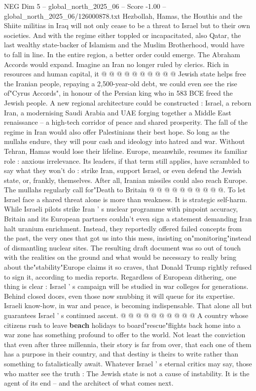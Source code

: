 \begin{textsample}{NEG Dim 5 – global\_north\_2025\_06 – Score -1.00 – global\_north\_2025\_06/126000878.txt}
Hezbollah, Hamas, the Houthis and the Shiite militias in Iraq will not only cease to be a threat to Israel but to their own societies.
And with the regime either toppled or incapacitated, also Qatar, the last wealthy state-backer of Islamism and the Muslim Brotherhood, would have to fall in line.
In the entire region, a better order could emerge.
The Abraham Accords would expand.
Imagine an Iran no longer ruled by clerics.
Rich in resources and human capital, it @ @ @ @ @ @ @ @ @ @ Jewish state helps free the Iranian people, repaying a 2,500-year-old debt, we could even see the rise of"Cyrus Accords", in honour of the Persian king who in 583 BCE freed the Jewish people.
A new regional architecture could be constructed : Israel, a reborn Iran, a modernising Saudi Arabia and UAE forging together a Middle East renaissance -- a high-tech corridor of peace and shared prosperity.
The fall of the regime in Iran would also offer Palestinians their best hope.
So long as the mullahs endure, they will pour cash and ideology into hatred and war.
Without Tehran, Hamas would lose their lifeline.
Europe, meanwhile, resumes its familiar role : anxious irrelevance.
Its leaders, if that term still applies, have scrambled to say what they won't do : strike Iran, support Israel, or even defend the Jewish state, or, frankly, themselves.
After all, Iranian missiles could also reach Europe.
The mullahs regularly call for"Death to Britain @ @ @ @ @ @ @ @ @ @.
To let Israel face a shared threat alone is more than weakness.
It is strategic self-harm.
While Israeli pilots strike Iran ' s nuclear programme with pinpoint accuracy, Britain and its European partners couldn't even sign a statement demanding Iran halt uranium enrichment.
Instead, they reportedly offered failed concepts from the past, the very ones that got us into this mess, insisting on"monitoring"instead of dismantling nuclear sites.
The resulting draft document was so out of touch with the realities on the ground and what would be necessary to really bring about the"stability"Europe claims it so craves, that Donald Trump rightly refused to sign it, according to media reports.
Regardless of European dithering, one thing is clear : Israel ' s campaign will be studied in war colleges for generations.
Behind closed doors, even those now snubbing it will queue for its expertise.
Israeli know-how, in war and peace, is becoming indispensable.
That alone all but guarantees Israel ' s continued ascent. @ @ @ @ @ @ @ @ @ @ A country whose citizens rush to leave \textbf{beach} holidays to board"rescue"flights back home into a war zone has something profound to offer to the world.
Not least the conviction that even after three millennia, their story is far from over, that each one of them has a purpose in their country, and that destiny is theirs to write rather than something to fatalistically await.
Whatever Israel ' s eternal critics may say, those who matter see the truth : The Jewish state is not a cause of instability.
It is the agent of its end -- and the architect of what comes next.

\end{textsample}
